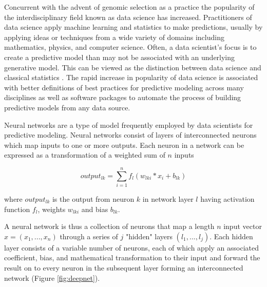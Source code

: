 Concurrent with the advent of genomic selection as a practice the popularity of the 
interdisciplinary field known as data science has increased. Practitioners of data 
science apply machine learning and statistics to make predictions, usually
by applying ideas or techniques from a wide variety of domains 
including mathematics, physics, and computer science. Often, a data scientist's focus is to
create a predictive model than may not be associated with an underlying generative model. 
This can be viewed as the distinction between data science and classical statistics 
\citep{donoho2015, breiman2001}. The rapid increase in popularity of data science
is associated with better definitions of best practices for predictive modeling
across many disciplines as well as software packages to automate the 
process of building predictive models from any data source.

Neural networks are a type of model frequently employed by data scientists
for predictive modeling. Neural networks consist of layers of interconnected neurons
which map inputs to one or more outputs. Each neuron in a network can be expressed as a 
transformation of a weighted sum of $n$ inputs 

\begin{equation}
output_{lk} = \sum_{i=1}^{n} f_l(w_{lki} * x_{i} + b_{lk})
\label{eq:neuron}
\end{equation}

where $output_{lk}$ is the output from neuron $k$ in network layer $l$ having activation
function $f_l$, weights $w_{lki}$ and bias $b_{lk}$.

A neural network is thus a collection of neurons that map a 
length $n$ input vector $x = (x_1, ..., x_n)$ through a series of $j$ 
"hidden" layers $(l_1, ..., l_j)$. Each hidden layer consists of a variable 
number of neurons, each of which apply an associated coefficient, bias, and 
mathematical transformation to their input and forward the 
result on to every neuron in the subsequent layer forming an interconnected
network (Figure \ref{fig:deepnet}).

\ifdefined\showtablesandfigures
\fi

